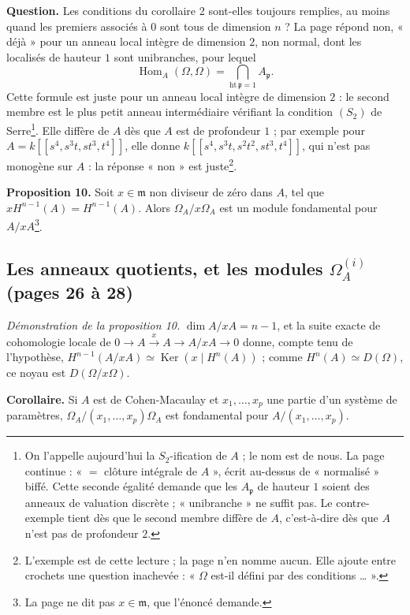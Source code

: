 \documentclass[11pt,a4paper]{article}
\begin{document}
\textbf{Question.} Les conditions du corollaire 2 sont-elles toujours remplies,
au moins quand les premiers associés à $0$ sont tous de dimension $n$ ? La page
répond non, « déjà » pour un anneau local intègre de dimension $2$, non
normal, dont les localisés de hauteur $1$ sont unibranches, pour lequel
\[
  \operatorname{Hom}_A(\Omega, \Omega) = \bigcap_{\mathrm{ht}\,\mathfrak{p} = 1}
  A_{\mathfrak{p}} .
\]
Cette formule est juste pour un anneau local intègre de dimension $2$ : le
second membre est le plus petit anneau intermédiaire vérifiant la condition
$(S_2)$ de Serre\footnote{On l'appelle aujourd'hui la $S_2$-ification de $A$ ;
le nom est de nous. La page continue : « $=$ clôture intégrale de $A$ », écrit
au-dessus de « normalisé » biffé. Cette seconde égalité demande que les
$A_{\mathfrak{p}}$ de hauteur $1$ soient des anneaux de valuation discrète ;
« unibranche » ne suffit pas. Le contre-exemple tient dès que le second membre
diffère de $A$, c'est-à-dire dès que $A$ n'est pas de profondeur $2$.}. Elle
diffère de $A$ dès que $A$ est de profondeur $1$ ; par exemple pour $A =
k[[s^4, s^3t, st^3, t^4]]$, elle donne $k[[s^4, s^3t, s^2t^2, st^3, t^4]]$, qui
n'est pas monogène sur $A$ : la réponse « non » est juste\footnote{L'exemple
est de cette lecture ; la page n'en nomme aucun. Elle ajoute entre crochets
une question inachevée : « $\Omega$ est-il défini par des conditions
\ldots{} ».}.

\textbf{Proposition 10.} Soit $x \in \mathfrak{m}$ non diviseur de zéro dans
$A$, tel que $x H^{n-1}(A) = H^{n-1}(A)$. Alors $\Omega_A/x\Omega_A$ est un
module fondamental pour $A/xA$\footnote{La page ne dit pas $x \in
\mathfrak{m}$, que l'énoncé demande.}.

\subsection*{Les anneaux quotients, et les modules $\Omega_A^{(i)}$ (pages 26 à 28)}

\emph{Démonstration de la proposition 10.} $\dim A/xA = n-1$, et la suite
exacte de cohomologie locale de $0 \to A \xrightarrow{x} A \to A/xA \to 0$
donne, compte tenu de l'hypothèse, $H^{n-1}(A/xA) \simeq \operatorname{Ker}(x
\mid H^n(A))$ ; comme $H^n(A) \simeq D(\Omega)$, ce noyau est $D(\Omega/x\Omega)$.

\textbf{Corollaire.} Si $A$ est de Cohen-Macaulay et $x_1, \ldots, x_p$ une
partie d'un système de paramètres, $\Omega_A/(x_1, \ldots, x_p)\Omega_A$ est
fondamental pour $A/(x_1, \ldots, x_p)$.
\end{document}
